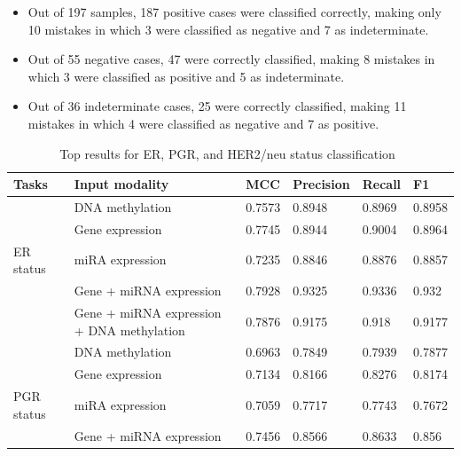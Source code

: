 \begin{itemize}[noitemsep]
    \item Out of 197 samples, 187 positive cases were classified correctly, making only 10 mistakes in which 3 were classified as negative and 7 as indeterminate. 

    \item Out of 55 negative cases, 47 were correctly classified, making 8 mistakes in which 3 were classified as positive and 5 as indeterminate. 

    \item Out of 36 indeterminate cases, 25 were correctly classified, making 11 mistakes in which 4 were classified as negative and 7 as positive.  
\end{itemize}

\begin{table}[h]
    \centering
    \footnotesize
    \caption{Top results for ER, PGR, and HER2/neu status classification~\cite{karimACCESS2019}}
    \vspace{-2mm}
    \label{tab:all_results}
    \begin{tabular}{l|l|l|l|l|l} 
        \hline
        \textbf{Tasks} & \textbf{Input modality} & \textbf{MCC} & \textbf{Precision} & \textbf{Recall} & \textbf{F1} \\ 
        \hline
         & DNA methylation   & 0.7573 & 0.8948    & 0.8969 & 0.8958  \\ 
        \cline{2-6}
            & Gene expression  & 0.7745 & 0.8944    & 0.9004 & 0.8964  \\ 
        \cline{2-6}
        ER status       & miRA expression & 0.7235 & 0.8846    & 0.8876 & 0.8857  \\ 
        \cline{2-6}
                      & Gene + miRNA expression  & 0.7928 & 0.9325    & 0.9336 & 0.932   \\ 
        \cline{2-6}
                   & Gene + miRNA expression + DNA methylation & 0.7876 & 0.9175    & 0.918  & 0.9177  \\ 
        \hline
                     & DNA methylation   & 0.6963 & 0.7849    & 0.7939 & 0.7877  \\ 
        \cline{2-6}
                       & Gene expression  & 0.7134 & 0.8166    & 0.8276 & 0.8174  \\ 
        \cline{2-6}
        PGR status  & miRA expression   & 0.7059 & 0.7717    & 0.7743 & 0.7672  \\ 
        \cline{2-6}
                     & Gene + miRNA expression   & 0.7456 & 0.8566    & 0.8633 & 0.856   \\ 

\end{tabular}
\end{table}

